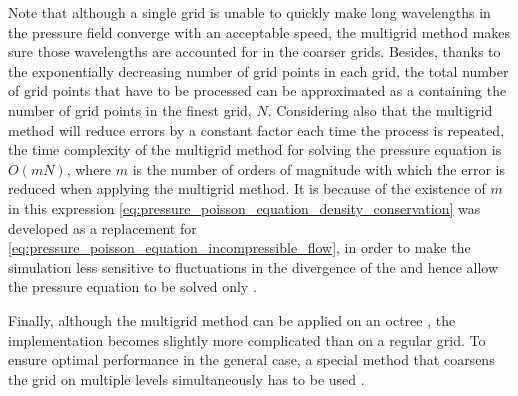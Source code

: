 Note that although a single grid is unable to quickly make long wavelengths in the pressure field converge with an acceptable speed, the multigrid method makes sure those wavelengths are accounted for in the coarser grids. Besides, thanks to the exponentially decreasing number of grid points in each grid, the total number of grid points that have to be processed can be approximated as a  containing the number of grid points in the finest grid, $N$. Considering also that the multigrid method will reduce errors by a constant factor each time the process is repeated, the time complexity of the multigrid method for solving the pressure equation is $O(mN)$, where $m$ is the number of orders of magnitude with which the error is reduced when applying the multigrid method. It is because of the existence of $m$ in this expression \eqref{eq:pressure_poisson_equation_density_conservation} was developed as a replacement for \eqref{eq:pressure_poisson_equation_incompressible_flow}, in order to make the simulation less sensitive to fluctuations in the divergence of the  and hence allow the pressure equation to be solved only \approximately.

Finally, although the multigrid method can be applied on an octree \citep{Popinet2003,Ji2012}, the implementation becomes slightly more complicated than on a regular grid. To ensure optimal performance in the general case, a special method that coarsens the grid on multiple levels simultaneously has to be used \citep{Popinet2003}.


